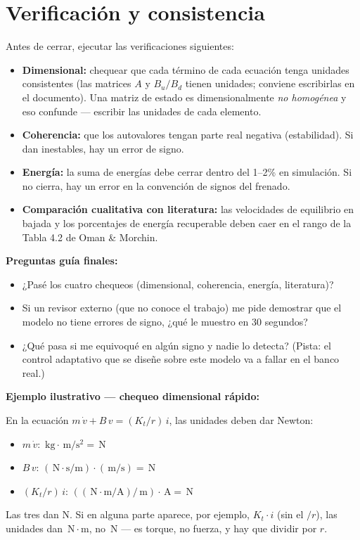 \documentclass[11pt,a4paper]{article}
\newcommand{\unit}[1]{\,\mathrm{#1}}
\begin{document}
\hrulefill

\section{Verificación y consistencia}

Antes de cerrar, ejecutar las verificaciones siguientes:

\begin{itemize}
    \item \textbf{Dimensional:} chequear que cada término de cada ecuación tenga unidades consistentes (las matrices $A$ y $B_u/B_d$ tienen unidades; conviene escribirlas en el documento). Una matriz de estado es dimensionalmente \textit{no homogénea} y eso confunde --- escribir las unidades de cada elemento.
    \item \textbf{Coherencia:} que los autovalores tengan parte real negativa (estabilidad). Si dan inestables, hay un error de signo.
    \item \textbf{Energía:} la suma de energías debe cerrar dentro del 1--2\% en simulación. Si no cierra, hay un error en la convención de signos del frenado.
    \item \textbf{Comparación cualitativa con literatura:} las velocidades de equilibrio en bajada y los porcentajes de energía recuperable deben caer en el rango de la Tabla 4.2 de Oman \& Morchin.
\end{itemize}

\begin{guia}
\textbf{Preguntas guía finales:}
\begin{itemize}
    \item ¿Pasé los cuatro chequeos (dimensional, coherencia, energía, literatura)?
    \item Si un revisor externo (que no conoce el trabajo) me pide demostrar que el modelo no tiene errores de signo, ¿qué le muestro en 30 segundos?
    \item ¿Qué pasa si me equivoqué en algún signo y nadie lo detecta? (Pista: el control adaptativo que se diseñe sobre este modelo va a fallar en el banco real.)
\end{itemize}
\end{guia}

\begin{ejemplo}
\textbf{Ejemplo ilustrativo --- chequeo dimensional rápido:}

En la ecuación $m\,\dot{v} + B\,v = (K_t/r)\,i$, las unidades deben dar Newton:

\begin{itemize}
    \item $m\,\dot{v}$: $\unit{kg} \cdot \unit{m/s^2} = \unit{N}$ \checkmark
    \item $B\,v$: $(\unit{N\cdot s/m}) \cdot (\unit{m/s}) = \unit{N}$ \checkmark
    \item $(K_t/r)\,i$: $((\unit{N\cdot m/A})/\unit{m}) \cdot \unit{A} = \unit{N}$ \checkmark
\end{itemize}

Las tres dan N. Si en alguna parte aparece, por ejemplo, $K_t \cdot i$ (sin el $/r$), las unidades dan $\unit{N\cdot m}$, no $\unit{N}$ --- es torque, no fuerza, y hay que dividir por $r$.
\end{ejemplo}
\end{document}
